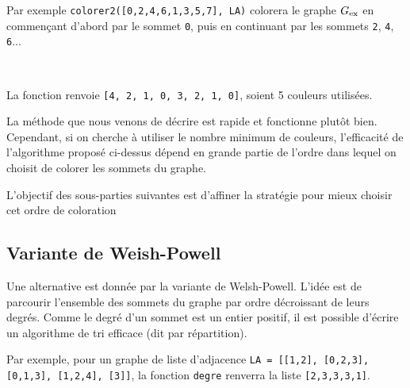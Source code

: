 Par exemple \lstinline{colorer2([0,2,4,6,1,3,5,7], LA)} colorera le graphe ${G}_{\text{ex}}$ en commençant d'abord par le sommet \lstinline{0}, puis en continuant par les sommets \lstinline{2}, \lstinline{4}, \lstinline{6}...
\ifprof
\begin{corrige}~\\ \vspace{-.5cm}

\end{corrige}
\else
\fi

\ifprof
\begin{corrige}
La fonction renvoie \lstinline{[4, 2, 1, 0, 3, 2, 1, 0]}, soient 5 couleurs utilisées. 
\end{corrige}
\else
\fi

La méthode que nous venons de décrire est rapide et fonctionne plutôt bien. Cependant, si on cherche à utiliser le nombre minimum de couleurs, l'efficacité de l'algorithme proposé ci-dessus dépend en grande partie de l'ordre dans lequel on choisit de colorer les sommets du graphe. 

L'objectif des sous-parties suivantes est d'affiner la stratégie pour mieux choisir cet ordre de coloration


\subsection{Variante de Weish-Powell}
Une alternative est donnée par la variante de Welsh-Powell. L'idée est de parcourir l'ensemble des sommets du graphe par ordre décroissant de leurs degrés.
Comme le degré d'un sommet est un entier positif, il est possible d'écrire un algorithme de tri efficace (dit par répartition).



Par exemple, pour un graphe de liste d'adjacence \lstinline{LA = [[1,2], [0,2,3], [0,1,3], [1,2,4], [3]]}, la fonction \lstinline{degre} renverra la liste \lstinline{[2,3,3,3,1]}.

\ifprof
\begin{corrige}~\\ \vspace{-.5cm}

\end{corrige}
\else
\fi

